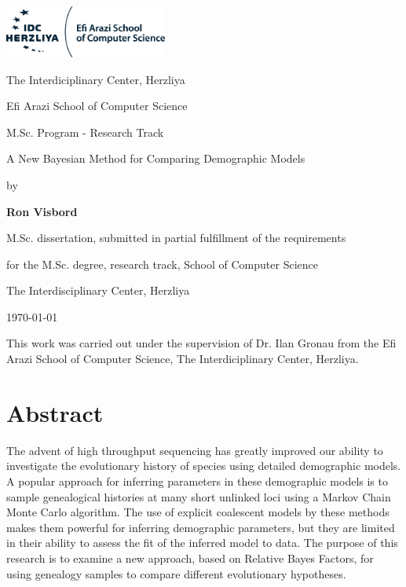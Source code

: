 \documentclass[11pt]{article}
\author{Ron Visbord}
\newcommand{\1}{\mathbbm{1}}
\begin{document}
\begin{titlepage}
	\centering
	\includegraphics[width=0.4\textwidth]{logos/IDC_logo}\par\vspace{2cm}
	{\huge The Interdiciplinary Center, Herzliya \par}
	{\Large Efi Arazi School of Computer Science \par}
	{\Large M.Sc. Program - Research Track \par}
	
	\vspace{1cm}
	
	\vspace{1.5cm}
	{\Huge A New Bayesian Method for Comparing Demographic Models \par}
	\vspace{3cm}
	{\large by\par}
	{\large\bfseries Ron Visbord\par}
	
	\vspace{2cm}
	{M.Sc. dissertation, submitted in partial fulfillment of the requirements\par}
	{for the M.Sc. degree, research track, School of Computer Science\par}
	{The Interdisciplinary Center, Herzliya}
	
	\vfill
	
	{\large \monthyeardate\today \par}
	
\end{titlepage}

\newpage

This work was carried out under the supervision of Dr. Ilan Gronau from the Efi Arazi School of Computer Science, The Interdiciplinary Center, Herzliya.

\newpage


\section*{Abstract}
The advent of high throughput sequencing has greatly improved our ability to investigate the evolutionary history of species using detailed demographic models. A popular approach for inferring parameters in these demographic models is to sample genealogical histories at many short unlinked loci using a Markov Chain Monte Carlo algorithm. The use of explicit coalescent models by these methods makes them powerful for inferring demographic parameters, but they are limited in their ability to assess the fit of the inferred model to data. The purpose of this research is to examine a new approach, based on Relative Bayes Factors, for using genealogy samples to compare different evolutionary hypotheses. 
\end{document}
